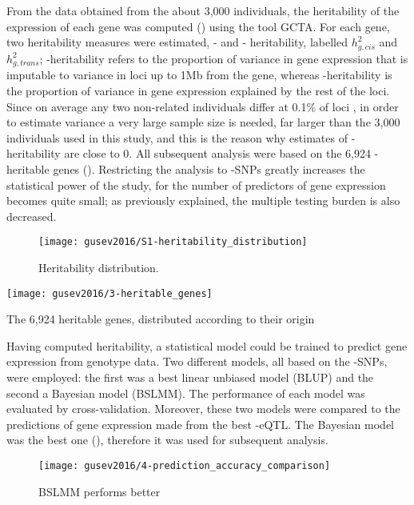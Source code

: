 \documentclass[../main.tex]{subfiles}
\begin{document}
From the data obtained from the about 3,000 individuals, the 
heritability of the expression of each gene was computed 
() using the tool GCTA\cite{Yang2011}. For each 
gene, two heritability measures were estimated, \cis- and \trans- 
heritability, labelled $h_{g,cis}^2$ and $h_{g,trans}^2$; 
\cis-heritability refers to the proportion of variance in gene 
expression that is imputable to variance in loci up to 1Mb from the 
gene, whereas \trans-heritability is the proportion of variance in gene 
expression explained by the rest of the loci. Since on average any two 
non-related individuals differ at 0.1\% of loci \cite{1000Genomes}, in 
order to estimate \trans variance a very large sample size is needed, 
far larger than the 3,000 individuals used in this study, and this is 
the reason why estimates of \trans-heritability are close to 0. All 
subsequent analysis were based on the 6,924 \cis-heritable genes 
(). Restricting the analysis to \cis-SNPs greatly 
increases the statistical power of the study, for the number of 
predictors of gene expression becomes quite small; as previously 
explained, the multiple testing burden is also decreased.

\begin{figure}
	\texttt{[image: gusev2016/S1-heritability\_distribution]}
	\caption{Heritability distribution.}
\end{figure}

\begin{marginfigure}[-4cm]
	\texttt{[image: gusev2016/3-heritable\_genes]}
	\caption{The 6,924 heritable genes, distributed according to their 
origin}
\end{marginfigure}

Having computed heritability, a statistical model could be trained to 
predict gene expression from genotype data. Two different models, all 
based on the \cis-SNPs, were employed: the first was a best linear 
unbiased model (BLUP) and the second a Bayesian model (BSLMM). The 
performance of each model was evaluated by cross-validation. Moreover, 
these two models were compared to the predictions of gene expression 
made from the best \cis-eQTL. The Bayesian model was the best one 
(), therefore it was used for subsequent analysis.

\begin{figure}
	\texttt{[image: gusev2016/4-prediction\_accuracy\_comparison]}
	\caption{BSLMM performs better}
\end{figure}
\end{document}
